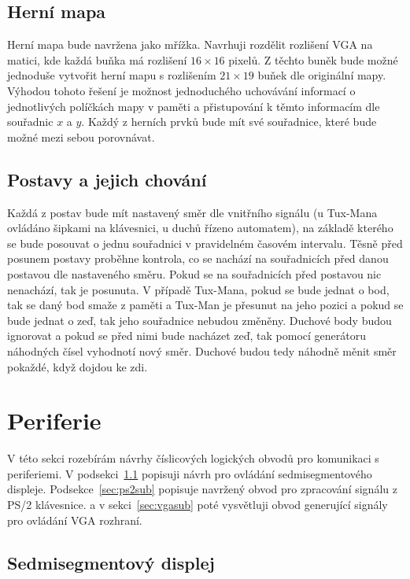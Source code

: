 \documentclass{report}
\begin{document}
\subsection{Herní mapa}\label{sec:hernimapanavrh}
Herní mapa bude navržena jako mřížka. Navrhuji rozdělit rozlišení VGA na matici, kde každá buňka má rozlišení $16×16$ pixelů. Z těchto buněk bude možné jednoduše vytvořit herní mapu s rozlišením $21×19$ buňek dle originální mapy. Výhodou tohoto řešení je možnost jednoduchého uchovávání informací o jednotlivých políčkách mapy v paměti a přistupování k těmto informacím dle souřadnic $x$ a $y$. Každý z herních prvků bude mít své souřadnice, které bude možné mezi sebou porovnávat. 
\subsection{Postavy a jejich chování}\label{sec:postavyachovani}
Každá z postav bude mít nastavený směr dle vnitřního signálu (u Tux-Mana ovládáno šipkami na klávesnici, u duchů řízeno automatem), na základě kterého se bude posouvat o jednu souřadnici v pravidelném časovém intervalu. Těsně před posunem postavy proběhne kontrola, co se nachází na souřadnicích před danou postavou dle nastaveného směru. Pokud se na souřadnicích před postavou nic nenachází, tak je posunuta. V případě Tux-Mana, pokud se bude jednat o bod, tak se daný bod smaže z paměti a Tux-Man je přesunut na jeho pozici a pokud se bude jednat o zeď, tak jeho souřadnice nebudou změněny. Duchové body budou ignorovat a pokud se před nimi bude nacházet zeď, tak pomocí generátoru náhodných čísel vyhodnotí nový směr. Duchové budou tedy náhodně měnit směr pokaždé, když dojdou ke zdi.

\section{Periferie}\label{sec:periferie}
V této sekci rozebírám návrhy číslicových logických obvodů pro komunikaci s periferiemi. V podsekci~\ref{sec:sedmisegmentdisplej} popisuji návrh pro ovládání sedmisegmentového displeje. Podsekce~\ref{sec:ps2sub} popisuje navržený obvod pro zpracování signálu z PS/2 klávesnice. a v sekci~\ref{sec:vgasub} poté vysvětluji obvod generující signály pro ovládání VGA rozhraní.

\subsection{Sedmisegmentový displej}\label{sec:sedmisegmentdisplej}
\end{document}
